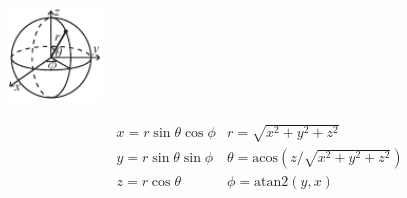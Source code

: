 


\begin{center}
\includegraphics[width=25mm]{content/geometry/sphericalCoordinates}
\end{center}
\[\begin{array}{cc}
x = r\sin\theta\cos\phi & r = \sqrt{x^2+y^2+z^2}\\
y = r\sin\theta\sin\phi & \theta = \textrm{acos}(z/\sqrt{x^2+y^2+z^2})\\
z = r\cos\theta & \phi = \textrm{atan2}(y,x)
\end{array}\]




